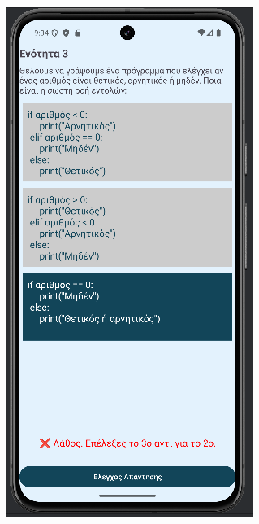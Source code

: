 \documentclass[11pt]{report}
\begin{document}
\begin{figure}[H]
  \centering
  \begin{minipage}[b]{0.45\textwidth}
    \includegraphics[width=\linewidth, height=0.35\textheight, keepaspectratio]{Figures/εικόνα (6).png}

\end{minipage}
\end{figure}
\end{document}
